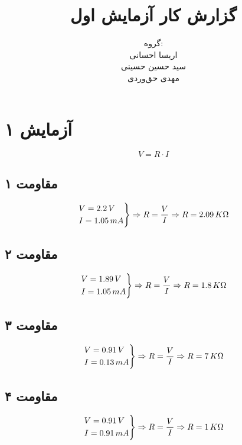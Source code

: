 \documentclass{article}
\title{گزارش کار آزمایش اول}
\author{
	گروه: \\
	اریسا احسانی \\
	سید حسین حسینی \\
	مهدی حق‌وردی
}
\begin{document}
	\maketitle
	\tableofcontents
	\newpage
	
	\section{آزمایش ۱}
		\begin{equation}
			V = R \cdot I
		\end{equation}
		
		\subsection{مقاومت ۱}		
		    \begin{equation*}
		    	\begin{rcases}
		    		V = 2.2 \, V  \\	
		    		I = 1.05 \, mA
		    	\end{rcases}
	    		\Rightarrow R = \frac{V}{I} \Rightarrow R = 2.09 \, K \Omega
		    \end{equation*}
		\subsection{مقاومت ۲}
		    \begin{equation*}
				\begin{rcases}
					V = 1.89 \, V  \\	
					I = 1.05 \, mA
				\end{rcases}
				\Rightarrow R = \frac{V}{I} \Rightarrow R = 1.8 \, K \Omega
			\end{equation*}
			
		\subsection{مقاومت ۳}
		   \begin{equation*}
				\begin{rcases}
					V = 0.91 \, V  \\	
					I = 0.13 \, mA
				\end{rcases}
				\Rightarrow R = \frac{V}{I} \Rightarrow R = 7 \, K \Omega
			\end{equation*}
		
		\subsection{مقاومت ۴}
		     \begin{equation*}
		 	 \begin{rcases}
		 	    V = 0.91 \, V  \\	
		 		I = 0.91 \, mA
		 	\end{rcases}
		 	\Rightarrow R = \frac{V}{I} \Rightarrow R = 1 \, K \Omega
		 \end{equation*}
		 
\end{document}
